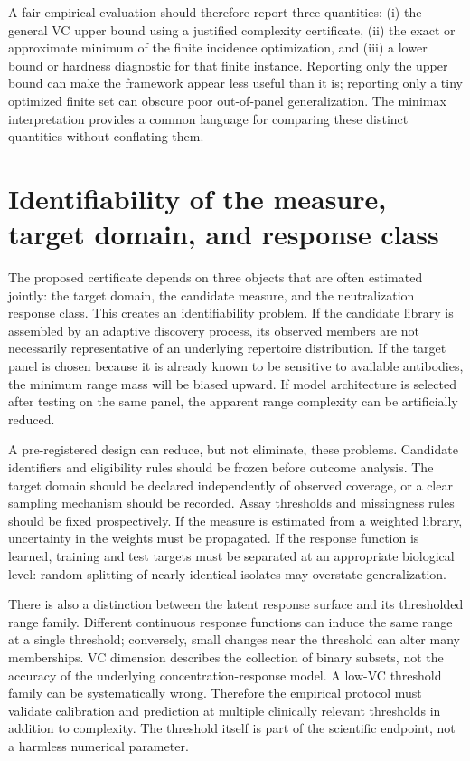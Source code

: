 \documentclass[11pt,a4paper]{article}
\begin{document}
A fair empirical evaluation should therefore report three quantities: (i) the general VC upper bound using a justified complexity certificate, (ii) the exact or approximate minimum of the finite incidence optimization, and (iii) a lower bound or hardness diagnostic for that finite instance. Reporting only the upper bound can make the framework appear less useful than it is; reporting only a tiny optimized finite set can obscure poor out-of-panel generalization. The minimax interpretation provides a common language for comparing these distinct quantities without conflating them.

\section{Identifiability of the measure, target domain, and response class}
The proposed certificate depends on three objects that are often estimated jointly: the target domain, the candidate measure, and the neutralization response class. This creates an identifiability problem. If the candidate library is assembled by an adaptive discovery process, its observed members are not necessarily representative of an underlying repertoire distribution. If the target panel is chosen because it is already known to be sensitive to available antibodies, the minimum range mass will be biased upward. If model architecture is selected after testing on the same panel, the apparent range complexity can be artificially reduced.

A pre-registered design can reduce, but not eliminate, these problems. Candidate identifiers and eligibility rules should be frozen before outcome analysis. The target domain should be declared independently of observed coverage, or a clear sampling mechanism should be recorded. Assay thresholds and missingness rules should be fixed prospectively. If the measure is estimated from a weighted library, uncertainty in the weights must be propagated. If the response function is learned, training and test targets must be separated at an appropriate biological level: random splitting of nearly identical isolates may overstate generalization.

There is also a distinction between the latent response surface and its thresholded range family. Different continuous response functions can induce the same range at a single threshold; conversely, small changes near the threshold can alter many memberships. VC dimension describes the collection of binary subsets, not the accuracy of the underlying concentration-response model. A low-VC threshold family can be systematically wrong. Therefore the empirical protocol must validate calibration and prediction at multiple clinically relevant thresholds in addition to complexity. The threshold itself is part of the scientific endpoint, not a harmless numerical parameter.
\end{document}
